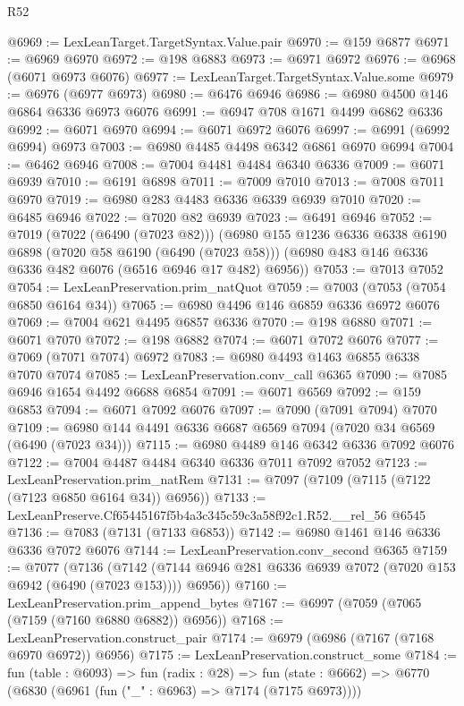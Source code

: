 \begin{lexlean}{R52}
\begin{coremodule}
@6969 := LexLeanTarget.TargetSyntax.Value.pair
@6970 := @159 @6877
@6971 := @6969 @6970
@6972 := @198 @6883
@6973 := @6971 @6972
@6976 := @6968 (@6071 @6973 @6076)
@6977 := LexLeanTarget.TargetSyntax.Value.some
@6979 := @6976 (@6977 @6973)
@6980 := @6476 @6946
@6986 := @6980 @4500 @146 @6864 @6336 @6973 @6076
@6991 := @6947 @708 @1671 @4499 @6862 @6336
@6992 := @6071 @6970
@6994 := @6071 @6972 @6076
@6997 := @6991 (@6992 @6994) @6973
@7003 := @6980 @4485 @4498 @6342 @6861 @6970 @6994
@7004 := @6462 @6946
@7008 := @7004 @4481 @4484 @6340 @6336
@7009 := @6071 @6939
@7010 := @6191 @6898
@7011 := @7009 @7010
@7013 := @7008 @7011 @6970
@7019 := @6980 @283 @4483 @6336 @6339 @6939 @7010
@7020 := @6485 @6946
@7022 := @7020 @82 @6939
@7023 := @6491 @6946
@7052 := @7019
    (@7022 (@6490 (@7023 @82)))
    (@6980
      @155
      @1236
      @6336
      @6338
      @6190
      @6898
      (@7020 @58 @6190 (@6490 (@7023 @58)))
      (@6980 @483 @146 @6336 @6336 @482 @6076 (@6516 @6946 @17 @482) @6956))
@7053 := @7013 @7052
@7054 := LexLeanPreservation.prim_natQuot
@7059 := @7003 (@7053 (@7054 @6850 @6164 @34))
@7065 := @6980 @4496 @146 @6859 @6336 @6972 @6076
@7069 := @7004 @621 @4495 @6857 @6336
@7070 := @198 @6880
@7071 := @6071 @7070
@7072 := @198 @6882
@7074 := @6071 @7072 @6076
@7077 := @7069 (@7071 @7074) @6972
@7083 := @6980 @4493 @1463 @6855 @6338 @7070 @7074
@7085 := LexLeanPreservation.conv_call @6365
@7090 := @7085 @6946 @1654 @4492 @6688 @6854
@7091 := @6071 @6569
@7092 := @159 @6853
@7094 := @6071 @7092 @6076
@7097 := @7090 (@7091 @7094) @7070
@7109 := @6980 @144 @4491 @6336 @6687 @6569 @7094 (@7020 @34 @6569 (@6490 (@7023 @34)))
@7115 := @6980 @4489 @146 @6342 @6336 @7092 @6076
@7122 := @7004 @4487 @4484 @6340 @6336 @7011 @7092 @7052
@7123 := LexLeanPreservation.prim_natRem
@7131 := @7097 (@7109 (@7115 (@7122 (@7123 @6850 @6164 @34)) @6956))
@7133 := LexLeanPreserve.Cf65445167f5b4a3c345c59c3a58f92c1.R52.__rel_56 @6545
@7136 := @7083 (@7131 (@7133 @6853))
@7142 := @6980 @1461 @146 @6336 @6336 @7072 @6076
@7144 := LexLeanPreservation.conv_second @6365
@7159 := @7077
    (@7136
      (@7142 (@7144 @6946 @281 @6336 @6939 @7072 (@7020 @153 @6942 (@6490 (@7023 @153)))) @6956))
@7160 := LexLeanPreservation.prim_append_bytes
@7167 := @6997 (@7059 (@7065 (@7159 (@7160 @6880 @6882)) @6956))
@7168 := LexLeanPreservation.construct_pair
@7174 := @6979 (@6986 (@7167 (@7168 @6970 @6972)) @6956)
@7175 := LexLeanPreservation.construct_some
@7184 := fun (table : @6093) =>
  fun (radix : @28) =>
  fun (state : @6662) => @6770 (@6830 (@6961 (fun ("_" : @6963) => @7174 (@7175 @6973))))

\end{coremodule}
\end{lexlean}
